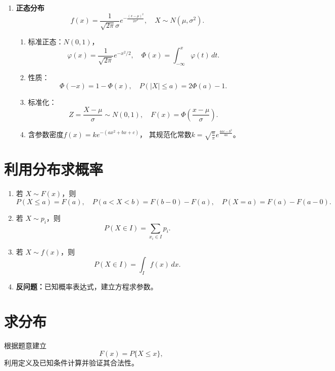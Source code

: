 \begin{enumerate}
      \item \textbf{正态分布}
            \[
                  f(x)=\frac{1}{\sqrt{2\pi}\sigma}e^{-\frac{(x-\mu)^2}{2\sigma^2}},\quad
                  X\sim N(\mu,\sigma^2).
            \]
            \begin{note}{}{}
                  \begin{enumerate}
                        \item 标准正态：$N(0,1)$，
                              \[
                                    \varphi(x)=\frac{1}{\sqrt{2\pi}}e^{-x^2/2},\quad
                                    \Phi(x)=\int_{-\infty}^x\varphi(t)\,dt.
                              \]
                        \item 性质：
                              \[
                                    \Phi(-x)=1-\Phi(x),\quad
                                    P(|X|\le a)=2\Phi(a)-1.
                              \]
                        \item 标准化：
                              \[
                                    Z=\frac{X-\mu}{\sigma}\sim N(0,1),
                                    \quad F(x)=\Phi\!\left(\frac{x-\mu}{\sigma}\right).
                              \]
                        \item 含参数密度$f(x)=ke^{-(ax^2+bx+c)}$，
                              其规范化常数$k=\sqrt{\frac{a}{\pi}}e^{\frac{4ac-b^2}{4a}}$。
                  \end{enumerate}
            \end{note}
\end{enumerate}


\section{利用分布求概率}
\DOne

\begin{enumerate}
      \item 若 $X\sim F(x)$，则
            \[
                  P(X\le a)=F(a),\quad
                  P(a<X<b)=F(b-0)-F(a),\quad
                  P(X=a)=F(a)-F(a-0).
            \]
      \item 若 $X\sim p_i$，则
            \[
                  P(X\in I)=\sum_{x_i\in I}p_i.
            \]
      \item 若 $X\sim f(x)$，则
            \[
                  P(X\in I)=\int_I f(x)\,dx.
            \]
      \item \textbf{反问题：}已知概率表达式，建立方程求参数。
\end{enumerate}


\section{求分布}
\DOne

根据题意建立
\[
      F(x)=P\{X\le x\},
\]
利用定义及已知条件计算并验证其合法性。